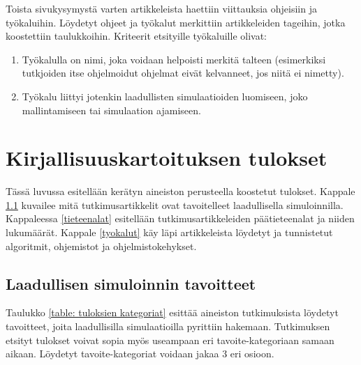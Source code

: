 \documentclass[utf8]{gradu3}
\begin{document}
Toista sivukysymystä varten artikkeleista haettiin viittauksia ohjeisiin ja työkaluihin. Löydetyt ohjeet ja työkalut merkittiin artikkeleiden tageihin, jotka koostettiin taulukkoihin.
Kriteerit etsityille työkaluille olivat:
\begin{enumerate}
    \item Työkalulla on nimi, joka voidaan helpoisti merkitä talteen (esimerkiksi tutkjoiden itse ohjelmoidut ohjelmat eivät kelvanneet, jos niitä ei nimetty).
    \item Työkalu liittyi jotenkin laadullisten simulaatioiden luomiseen, joko
    mallintamiseen tai simulaation ajamiseen.
\end{enumerate}

\chapter{Kirjallisuuskartoituksen tulokset}
Tässä luvussa esitellään kerätyn aineiston perusteella koostetut tulokset.
Kappale \ref{simulaatiotulokset} kuvailee 
mitä tutkimusartikkelit ovat tavoitelleet laadullisella simuloinnilla.
Kappaleessa \ref{tieteenalat} esitellään tutkimusartikkeleiden 
päätieteenalat ja niiden lukumäärät. 
Kappale \ref{tyokalut} käy läpi artikkeleista löydetyt 
ja tunnistetut algoritmit, ohjemistot ja ohjelmistokehykset. 

\section{Laadullisen simuloinnin tavoitteet} \label{simulaatiotulokset}
\begin{comment}
Jos tämä oli alussa kuvattu pääkysymykseksi, käsittely jää aika ohueksi.
\end{comment}
Taulukko \ref{table: tuloksien kategoriat} esittää aineiston tutkimuksista 
löydetyt tavoitteet, joita laadullisilla simulaatioilla pyrittiin hakemaan.
Tutkimuksen etsityt tulokset voivat sopia myös useampaan eri tavoite-kategoriaan
samaan aikaan. Löydetyt tavoite-kategoriat voidaan jakaa 3 eri osioon. 
\end{document}
